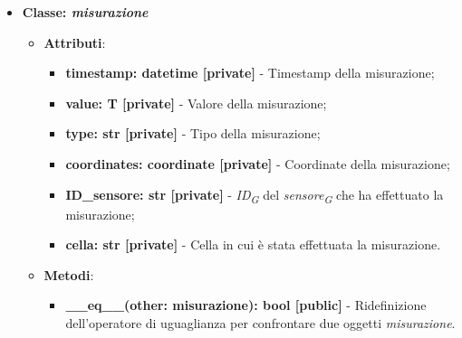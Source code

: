 \begin{itemize}
    \item\textbf{Classe: \textit{misurazione}}
    \begin{itemize}
        \item \textbf{Attributi}: 
    \begin{itemize}
        \item \textbf{timestamp: datetime [private]} - Timestamp della misurazione;
        \item \textbf{value: T [private]} - Valore della misurazione;
        \item \textbf{type: str [private]} - Tipo della misurazione;
        \item \textbf{coordinates: coordinate [private]} - Coordinate della misurazione;
        \item \textbf{ID\_sensore: str [private]} - \textit{ID}\textsubscript{\textit{G}} del \textit{sensore}\textsubscript{\textit{G}} che ha effettuato la misurazione;
        \item \textbf{cella: str [private]} - Cella in cui è stata effettuata la misurazione.
    \end{itemize}
    \item \textbf{Metodi}: 
    \begin{itemize}
        \item \textbf{\_\_eq\_\_(other: misurazione): bool [public]} - Ridefinizione dell'operatore di uguaglianza per confrontare due oggetti \textit{misurazione}.
    \end{itemize}
\end{itemize}


\end{itemize}
